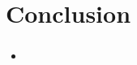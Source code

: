 \section{Conclusion}

\begin{frame} [c]
\frametitle{\insertsection}
\begin{itemize}
	\item 
\end{itemize}
\end{frame}